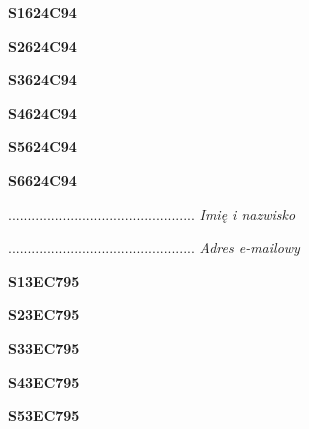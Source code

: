 \begin{turn}{90}\huge \textbf{S1624C94}\end{turn}

\begin{turn}{90}\huge \textbf{S2624C94}\end{turn}

\begin{turn}{90}\huge \textbf{S3624C94}\end{turn}

\begin{turn}{90}\huge \textbf{S4624C94}\end{turn}

\begin{turn}{90}\huge \textbf{S5624C94}\end{turn}

\begin{turn}{90}\huge \textbf{S6624C94}\end{turn}

\begin{turn}{90}\begin{minipage}{\linewidth} \vspace{20mm} ................................................  \textit{Imię i nazwisko}\end{minipage}\end{turn}

\begin{turn}{90}\begin{minipage}{\linewidth} \vspace{20mm} ................................................  \textit{Adres e-mailowy}\end{minipage}\end{turn}

\begin{turn}{90}\huge \textbf{S13EC795}\end{turn}

\begin{turn}{90}\huge \textbf{S23EC795}\end{turn}

\begin{turn}{90}\huge \textbf{S33EC795}\end{turn}

\begin{turn}{90}\huge \textbf{S43EC795}\end{turn}

\begin{turn}{90}\huge \textbf{S53EC795}\end{turn}

